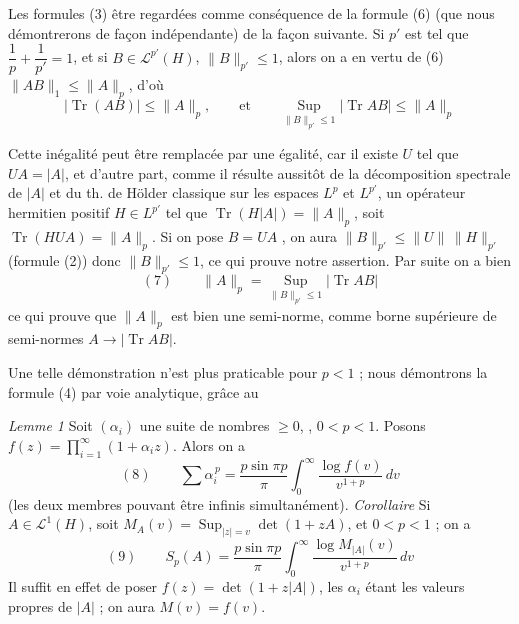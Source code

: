 \documentclass[11pt,a4paper]{article}
\begin{document}
\struck{\ill{}}  Les formules (3)  être regardées comme conséquence de la formule (6) (que nous démontrerons de façon indépendante) de la façon suivante. Si $p'$ est tel que $\dfrac1p + \dfrac1{p'} = 1$, et si $B \in \mathcal{L}^{p'}(H)$, \struck{\ill{}} $\|B\|_{p'} \leq 1$, alors on a en vertu de (6) $\|AB\|_1 \leq \|A\|_p$, d'où
\[
  |\operatorname{Tr}(AB)| \leq \|A\|_p, \qquad \text{et} \qquad \operatorname*{Sup}_{\|B\|_{p'} \leq 1} |\operatorname{Tr} AB| \leq \|A\|_p
\]

Cette inégalité peut être remplacée par une égalité, car il existe      $U$ tel que $UA = |A|$, \struck{\ill{}} et d'autre part, comme il résulte aussitôt de la décomposition spectrale de $|A|$ et du th. de Hölder classique sur les espaces $L^p$ et $L^{p'}$, un opérateur hermitien positif $H \in L^{p'}$ tel que $\operatorname{Tr}(H|A|) = \|A\|_p$, soit $\operatorname{Tr}(HUA) = \|A\|_p$. Si on pose $B = UA$ , on aura $\|B\|_{p'} \leq \|U\|\,\|H\|_{p'}$ (formule (2)) donc $\|B\|_{p'} \leq 1$, ce qui prouve notre assertion. Par suite on a bien
\[
  (7)\qquad \|A\|_p = \operatorname*{Sup}_{\|B\|_{p'} \leq 1} |\operatorname{Tr} AB|
\]
ce qui prouve que $\|A\|_p$ est bien une semi-norme, comme borne supérieure de semi-normes $A \to |\operatorname{Tr} AB|$.

Une telle démonstration n'est plus praticable pour $p < 1$ ;  nous démontrons la formule (4) par voie analytique, grâce au

\emph{Lemme 1} Soit $(\alpha_i)$ une suite  de nombres $\geq 0$, ,   $0 < p < 1$. Posons $f(z) = \prod_{i=1}^{\infty} (1 + \alpha_i z)$. Alors on a
\[
  (8)\qquad \sum \alpha_i^{\,p} = \frac{p \sin \pi p}{\pi} \int_0^\infty \frac{\log f(v)}{v^{1+p}}\, dv
\]
(les deux membres pouvant être infinis simultanément).
\emph{Corollaire} Si $A \in \mathcal{L}^1(H)$, soit $M_A(v) = \operatorname*{Sup}_{|z| = v} \det(1 + zA)$,   et $0 < p < 1$ ; on a
\[
  (9)\qquad S_p(A) = \frac{p \sin \pi p}{\pi} \int_0^\infty \frac{\log M_{|A|}(v)}{v^{1+p}}\, dv
\]
Il suffit en effet de poser $f(z) = \det(1 + z|A|)$, les $\alpha_i$ étant les valeurs propres de $|A|$ ; on aura  $M(v) = f(v)$.
\end{document}
